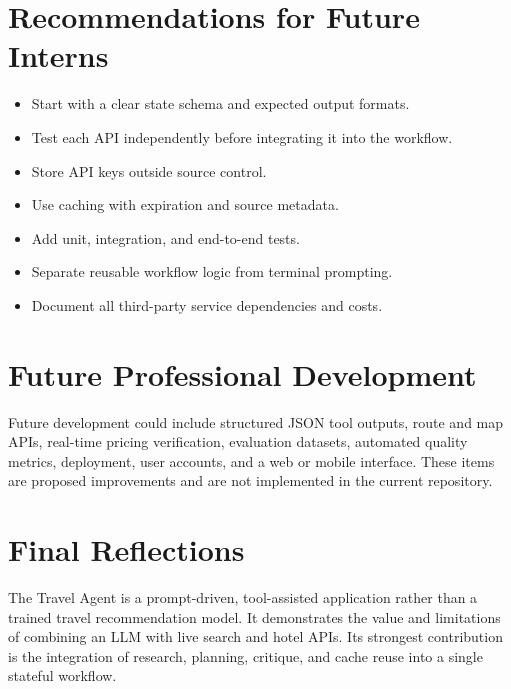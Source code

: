 \documentclass[12pt,a4paper]{report}
\begin{document}
\section{Recommendations for Future Interns}
\label{sec:intern-recommendations}
\begin{itemize}
    \item Start with a clear state schema and expected output formats.
    \item Test each API independently before integrating it into the workflow.
    \item Store API keys outside source control.
    \item Use caching with expiration and source metadata.
    \item Add unit, integration, and end-to-end tests.
    \item Separate reusable workflow logic from terminal prompting.
    \item Document all third-party service dependencies and costs.
\end{itemize}

\section{Future Professional Development}
\label{sec:future-professional-development}
Future development could include structured JSON tool outputs, route and map APIs, real-time
pricing verification, evaluation datasets, automated quality metrics, deployment, user accounts,
and a web or mobile interface. These items are proposed improvements and are not implemented
in the current repository.

\section{Final Reflections}
\label{sec:final-reflections}
The Travel Agent is a prompt-driven, tool-assisted application rather than a trained travel
recommendation model. It demonstrates the value and limitations of combining an LLM with live
search and hotel APIs. Its strongest contribution is the integration of research, planning,
critique, and cache reuse into a single stateful workflow.
\end{document}
